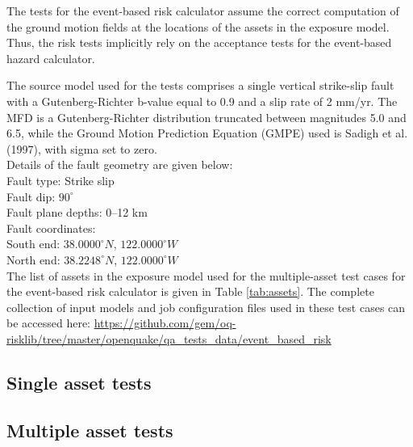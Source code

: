 The tests for the event-based risk calculator assume the correct computation of the ground motion fields at the locations of the assets in the exposure model. Thus, the risk tests implicitly rely on the acceptance tests for the event-based hazard calculator.

The source model used for the tests comprises a single vertical strike-slip fault with a Gutenberg-Richter b-value equal to 0.9 and a slip rate of 2 mm/yr. The MFD is a Gutenberg-Richter distribution truncated between magnitudes 5.0 and 6.5, while the Ground Motion Prediction Equation (GMPE) used is Sadigh et al. (1997), with sigma set to zero.\\

\noindent Details of the fault geometry are given below:\\

\noindent
Fault type: Strike slip\\
Fault dip: $90^{\circ}$\\
Fault plane depths: 0--12 km\\
Fault coordinates:\\
South end: $38.0000^{\circ} N$, $122.0000^{\circ} W$\\
North end: $38.2248^{\circ} N$, $122.0000^{\circ} W$\\



The list of assets in the exposure model used for the multiple-asset test cases for the event-based risk calculator is given in Table \ref{tab:assets}. The complete collection of input models and job configuration files used in these test cases can be accessed here:
\href{https://github.com/gem/oq-risklib/tree/master/openquake/qa_tests_data/event_based_risk}
{https://github.com/gem/oq-risklib/tree/master/openquake/qa\_tests\_data/event\_based\_risk}

\subsection{Single asset tests}
\label{subsec:eventbased-single}


\subsection{Multiple asset tests}
\label{subsec:eventbased-multiple}


